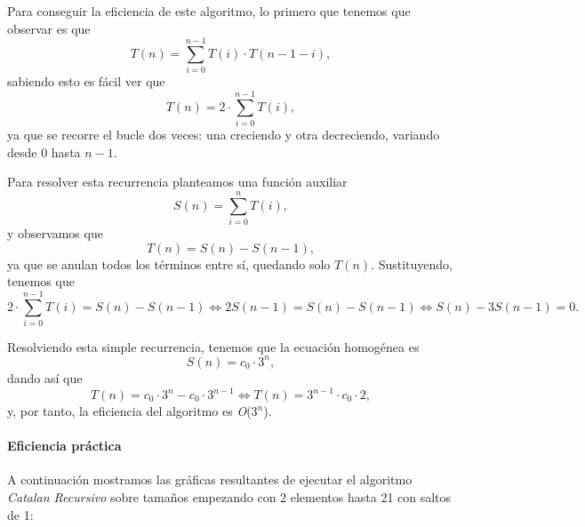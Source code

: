 \documentclass[a4paper,12pt]{article} %
\begin{document}
Para conseguir la eficiencia de este algoritmo, lo primero que tenemos que observar es que
\[
T(n) = \sum_{i=0}^{n-1} T(i) \cdot T(n-1-i),
\]
sabiendo esto es fácil ver que
\[
T(n) = 2 \cdot \sum_{i=0}^{n-1} T(i),
\]
ya que se recorre el bucle dos veces: una creciendo y otra decreciendo, variando desde 0 hasta \(n-1\).

Para resolver esta recurrencia planteamos una función auxiliar
\[
S(n) = \sum_{i=0}^{n} T(i),
\]
y observamos que
\[
T(n) = S(n) - S(n-1),
\]
ya que se anulan todos los términos entre sí, quedando solo \(T(n)\). Sustituyendo, tenemos que
\[
2 \cdot \sum_{i=0}^{n-1} T(i) = S(n) - S(n-1) \Longleftrightarrow 2S(n-1) = S(n) - S(n-1) \Longleftrightarrow S(n) - 3S(n-1) = 0.
\]

Resolviendo esta simple recurrencia, tenemos que la ecuación homogénea es
\[
S(n) = c_{0} \cdot 3^{n},
\]
dando así que
\[
T(n) = c_{0} \cdot 3^{n} - c_{0} \cdot 3^{n-1} \Longleftrightarrow T(n) = 3^{n-1} \cdot c_{0} \cdot 2,
\]
y, por tanto, la eficiencia del algoritmo es \textit{O}(\(3^{n}\)).


\paragraph{Eficiencia práctica}

A continuación mostramos las gráficas resultantes de ejecutar el algoritmo \textit{Catalan Recursivo}
sobre tamaños empezando con 2 elementos hasta 21 con saltos de 1:
\end{document}
